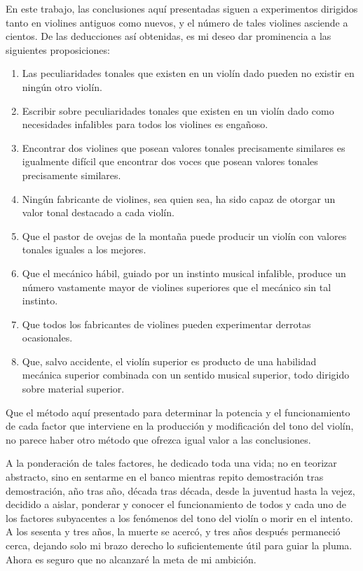 En este trabajo, las conclusiones aquí presentadas siguen a experimentos dirigidos tanto en violines antiguos como nuevos, y el número de tales violines asciende a cientos. De las deducciones así obtenidas, es mi deseo dar prominencia a las siguientes proposiciones:

\begin{enumerate}
 \item Las peculiaridades tonales que existen en un violín dado pueden no existir en ningún otro violín.
 \item Escribir sobre peculiaridades tonales que existen en un violín dado como necesidades infalibles para todos los violines es engañoso.
 \item Encontrar dos violines que posean valores tonales precisamente similares es igualmente difícil que encontrar dos voces que posean valores tonales precisamente similares.
 \item Ningún fabricante de violines, sea quien sea, ha sido capaz de otorgar un valor tonal destacado a cada violín.
 \item Que el pastor de ovejas de la montaña puede producir un violín con valores tonales iguales a los mejores.
 \item Que el mecánico hábil, guiado por un instinto musical infalible, produce un número vastamente mayor de violines superiores que el mecánico sin tal instinto.
 \item Que todos los fabricantes de violines pueden experimentar derrotas ocasionales.
 \item Que, salvo accidente, el violín superior es producto de una habilidad mecánica superior combinada con un sentido musical superior, todo dirigido sobre material superior.
\end{enumerate}
Que el método aquí presentado para determinar la potencia y el funcionamiento de cada factor que interviene en la producción y modificación del tono del violín, no parece haber otro método que ofrezca igual valor a las conclusiones.

A la ponderación de tales factores, he dedicado toda una vida; no en teorizar abstracto, sino en sentarme en el banco mientras repito demostración tras demostración, año tras año, década tras década, desde la juventud hasta la vejez, decidido a aislar, ponderar y conocer el funcionamiento de todos y cada uno de los factores subyacentes a los fenómenos del tono del violín o morir en el intento. A los sesenta y tres años, la muerte se acercó, y tres años después permaneció cerca, dejando solo mi brazo derecho lo suficientemente útil para guiar la pluma. Ahora es seguro que no alcanzaré la meta de mi ambición.

